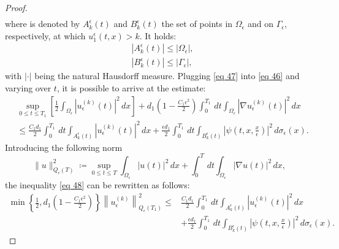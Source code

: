 \begin{proof}
\begin{equation}
\begin{aligned}
   \end{aligned}
\label{eq 47}\end{equation}
where is denoted by $A_{k}^{\epsilon}(t)$ and $B_{k}^{\epsilon}(t)$ the set of points in $\Omega_{\epsilon}$ and on $\Gamma_{\epsilon}$, respectively, at which $u_{1}^{\epsilon}(t, x)>k$. It holds:
$$
\begin{aligned}
&\left|A_{k}^{\epsilon}(t)\right| \leq\left|\Omega_{\epsilon}\right|, \\
&\left|B_{k}^{\epsilon}(t)\right| \leq\left|\Gamma_{\epsilon}\right|,
\end{aligned}
$$
with $|\cdot|$ being the natural Hausdorff measure.
Plugging \eqref{eq 47} into \eqref{eq 46} and varying over $t$, it is possible to arrive at the estimate: 
\begin{equation}
  \begin{aligned}
&\sup _{0 \leq t \leq T_{1}}\left[\frac{1}{2} \int_{\Omega_{\epsilon}}\left|u_{\epsilon}^{(k)}(t)\right|^{2} \, d  x\right]+d_{1}\left(1-\frac{C_{1} \epsilon^{2}}{2}\right) \int_{0}^{T_{1}} \, d  t \int_{\Omega_{\epsilon}}\left|\nabla u_{\epsilon}^{(k)}(t)\right|^{2} \, d  x \\
&\leq \frac{C_{1} d_{1}}{2} \int_{0}^{T_{1}} \, d  t \int_{A_{k}^{\epsilon}(t)}\left|u_{\epsilon}^{(k)}(t)\right|^{2} \, d  x+\frac{\epsilon d_{1}}{2} \int_{0}^{T_{1}} \, d  t \int_{B_{k}^{\epsilon}(t)}\left|\psi\left(t, x, \frac{x}{\epsilon}\right)\right|^{2} \, d  \sigma_{\epsilon}(x).
\end{aligned}
\label{eq 48}\end{equation}
Introducing the following norm
\begin{equation}
  \|u\|_{Q_{\epsilon}(T)}^{2}\coloneqq \sup _{0 \leq t \leq T} \int_{\Omega_{\epsilon}}|u(t)|^{2} \, d  x+\int_{0}^{T} \, d  t \int_{\Omega_{\epsilon}}|\nabla u(t)|^{2} \, d  x,
\label{eq 49}\end{equation}
the inequality \eqref{eq 48} can be rewritten as follows:
\begin{equation}
  \begin{aligned}
\min \left\{\frac{1}{2}, d_{1}\left(1-\frac{C_{1} \epsilon^{2}}{2}\right)\right\}\left\|u_{\epsilon}^{(k)}\right\|_{Q_{\epsilon}\left(T_{1}\right)}^{2} \leq & \frac{C_{1} d_{1}}{2} \int_{0}^{T_{1}} \, d  t \int_{A_{k}^{\epsilon}(t)}\left|u_{\epsilon}^{(k)}(t)\right|^{2} \, d  x \\
&+\frac{\epsilon d_{1}}{2} \int_{0}^{T_{1}} \, d  t \int_{B_{k}^{\epsilon}(t)}\left|\psi\left(t, x, \frac{x}{\epsilon}\right)\right|^{2} \, d  \sigma_{\epsilon}(x).

\end{aligned}
\end{equation}
\end{proof}
